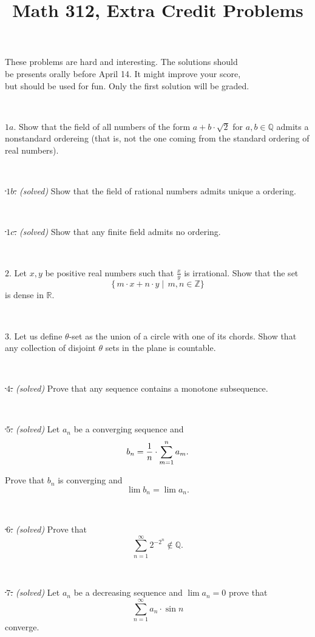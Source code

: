\documentclass{article}
\def\noi{\noindent}%
\def\RR{\mathbb{R}}%
\def\ZZ{\mathbb{Z}}%
\def\QQ{\mathbb{Q}}%
\begin{document}
\title{Math 312, Extra Credit Problems}
\author{}
\date{}
\maketitle

\begin{center}
{\small These problems are hard and interesting. The solutions should \\
be presents orally before April 14. It might improve your score,\\
but should be used for fun. Only the first solution will be graded.}
\end{center}
\thispagestyle{empty}

\ 

\noi $1a$. Show that the field of all numbers of the form $a+b\cdot\sqrt{2}$ for $a,b\in \QQ$ admits a nonstandard ordereing (that is, not the one coming from the standard ordering of real numbers).

\ 

\noi \sout{\,$1b$.} \textit{(solved)} Show that the field of rational numbers admits unique a ordering.

\ 

\noi \sout{\,$1c$.} \textit{(solved)} Show that any finite field admits no ordering.

\ 

\noi $2$. Let $x,y$ be positive real numbers such that $\tfrac xy$ is irrational.
Show that the set 
\[\{\,m{\cdot} x+n{\cdot} y\mid\,m,n\in\ZZ\}\] 
is dense in $\RR$.

\ 

\noi $3$. Let us define $\theta$-set as the union of a circle with one of its chords.
Show that any collection of disjoint $\theta$ sets in the plane is countable.

\ 

\noi \sout{\,$4$.} \textit{(solved)}  Prove that any sequence contains a monotone subsequence.

\ 

\noi \sout{\,$5$.} \textit{(solved)} Let $a_n$ be a converging sequence and 
$$b_n={1\over n}\cdot\sum_{m=1}^n a_m.$$

Prove that $b_n$ is converging and 
$$\lim b_n=\lim a_n.$$

\ 

\noi \sout{\,$6$.} \textit{(solved)} Prove that 
$$\sum_{n=1}^\infty 2^{-2^n}\not\in \QQ.$$

\ 

\noi \sout{\,$7$.} \textit{(solved)} Let $a_n$ be a decreasing sequence and $\lim a_n=0$ prove that 
$$\sum_{n=1}^\infty  a_n\cdot\sin n$$ 
converge.
\end{document}
